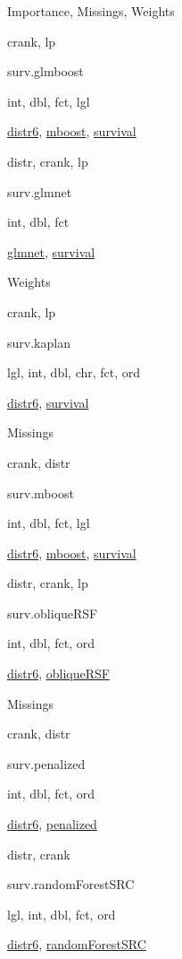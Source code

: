 \documentclass[]{article}
\begin{document}
Importance, Missings, Weights

crank, lp

surv.glmboost

int, dbl, fct, lgl

\href{https://cran.r-project.org/package=distr6}{distr6}, \href{https://cran.r-project.org/package=mboost}{mboost}, \href{https://cran.r-project.org/package=survival}{survival}

distr, crank, lp

surv.glmnet

int, dbl, fct

\href{https://cran.r-project.org/package=glmnet}{glmnet}, \href{https://cran.r-project.org/package=survival}{survival}

Weights

crank, lp

surv.kaplan

lgl, int, dbl, chr, fct, ord

\href{https://cran.r-project.org/package=distr6}{distr6}, \href{https://cran.r-project.org/package=survival}{survival}

Missings

crank, distr

surv.mboost

int, dbl, fct, lgl

\href{https://cran.r-project.org/package=distr6}{distr6}, \href{https://cran.r-project.org/package=mboost}{mboost}, \href{https://cran.r-project.org/package=survival}{survival}

distr, crank, lp

surv.obliqueRSF

int, dbl, fct, ord

\href{https://cran.r-project.org/package=distr6}{distr6}, \href{https://cran.r-project.org/package=obliqueRSF}{obliqueRSF}

Missings

crank, distr

surv.penalized

int, dbl, fct, ord

\href{https://cran.r-project.org/package=distr6}{distr6}, \href{https://cran.r-project.org/package=penalized}{penalized}

distr, crank

surv.randomForestSRC

lgl, int, dbl, fct, ord

\href{https://cran.r-project.org/package=distr6}{distr6}, \href{https://cran.r-project.org/package=randomForestSRC}{randomForestSRC}
\end{document}
